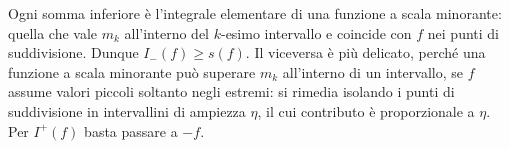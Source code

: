 \begin{schema}
\end{schema}

\begin{strategia}
Ogni somma inferiore è l'integrale elementare di una funzione a scala minorante:
quella che vale $m_{k}$ all'interno del $k$-esimo intervallo e coincide con $f$ nei punti
di suddivisione. Dunque $I_{-}(f)\ge s(f)$. Il viceversa è più delicato, perché una
funzione a scala minorante può superare $m_{k}$ all'interno di un intervallo, se $f$
assume valori piccoli soltanto negli estremi: si rimedia isolando i punti di
suddivisione in intervallini di ampiezza $\eta$, il cui contributo è proporzionale a
$\eta$. Per $I^{+}(f)$ basta passare a $-f$.
\end{strategia}

